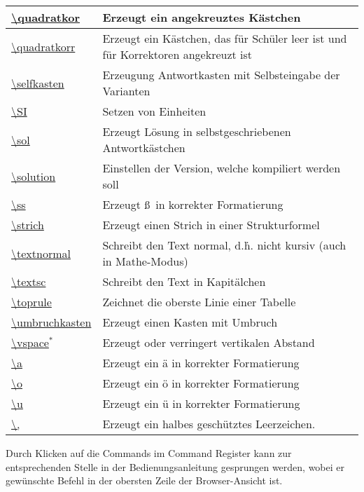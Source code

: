 \documentclass[./main.tex]{subfiles}
\begin{document}
\begin{tabularx}{\textwidth}{|l|X|}
    \hyperlink{quadratkor}{\textbackslash{}quadratkor}&Erzeugt ein angekreuztes K\"astchen\\\hline
    \hyperlink{quadratkorr}{\textbackslash{}quadratkorr}&Erzeugt ein K\"astchen, das f\"ur Sch\"uler leer ist und f\"ur Korrektoren angekreuzt ist\\\hline
    \hyperlink{selfkasten}{\textbackslash{}selfkasten}&Erzeugung Antwortkasten mit Selbsteingabe der Varianten\\\hline
    \hyperlink{SI}{\textbackslash{}SI}&Setzen von Einheiten\\\hline
    \hyperlink{sol}{\textbackslash{}sol}&Erzeugt L\"osung in selbstgeschriebenen Antwortk\"astchen\\\hline
    \hyperlink{solution}{\textbackslash{}solution}&Einstellen der Version, welche kompiliert werden soll\\\hline
    \hyperlink{ss\{\}}{\textbackslash{}ss}&Erzeugt \ss \ in korrekter Formatierung\\\hline
    \hyperlink{strich}{\textbackslash{}strich}&Erzeugt einen Strich in einer Strukturformel\\\hline
    \hyperlink{textnormal}{\textbackslash{}textnormal}&Schreibt den Text normal, d.\.h. nicht kursiv (auch in Mathe-Modus)\\\hline
    \hyperlink{textsc}{\textbackslash{}textsc}&Schreibt den Text in Kapit\"alchen\\\hline
    \hyperlink{toprule}{\textbackslash{}toprule}&Zeichnet die oberste Linie einer Tabelle\\\hline
    \hyperlink{umbruchkasten}{\textbackslash{}umbruchkasten}&Erzeugt einen Kasten mit Umbruch\\\hline
    \hyperlink{vspace}{\textbackslash vspace$^*$}&Erzeugt oder verringert vertikalen Abstand\\\hline
    \hyperlink{a}{\textbackslash{}\grqq{}a}&Erzeugt ein \"a in korrekter Formatierung\\\hline
    \hyperlink{o}{\textbackslash{}\grqq{}o}&Erzeugt ein \"o in korrekter Formatierung\\\hline
    \hyperlink{u}{\textbackslash{}\grqq{}u}&Erzeugt ein \"u in korrekter Formatierung\\\hline
    \hyperlink{,}{\textbackslash{},}&Erzeugt ein halbes gesch\"utztes Leerzeichen.\\\hline
\end{tabularx}

Durch Klicken auf die Commands im Command Register kann zur entsprechenden Stelle in der Bedienungsanleitung gesprungen werden, wobei er gew\"unschte Befehl in der obersten Zeile der Browser-Ansicht ist. 
\end{document}
